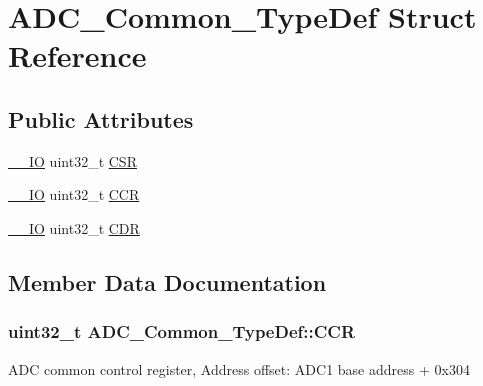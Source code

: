 \hypertarget{struct_a_d_c___common___type_def}{}\section{A\+D\+C\+\_\+\+Common\+\_\+\+Type\+Def Struct Reference}
\label{struct_a_d_c___common___type_def}
\subsection*{Public Attributes}
\begin{DoxyCompactItemize}
\item 
\hyperlink{core__cm4_8h_aec43007d9998a0a0e01faede4133d6be}{\+\_\+\+\_\+\+IO} uint32\+\_\+t \hyperlink{struct_a_d_c___common___type_def_ac38e24f600f9e134a54a0c43b976a4f4}{C\+SR}
\item 
\hyperlink{core__cm4_8h_aec43007d9998a0a0e01faede4133d6be}{\+\_\+\+\_\+\+IO} uint32\+\_\+t \hyperlink{struct_a_d_c___common___type_def_aee6d4af7571a1bad2fec9e7b53733277}{C\+CR}
\item 
\hyperlink{core__cm4_8h_aec43007d9998a0a0e01faede4133d6be}{\+\_\+\+\_\+\+IO} uint32\+\_\+t \hyperlink{struct_a_d_c___common___type_def_a6f7399bf70f677ef5de46a3038f414e1}{C\+DR}
\end{DoxyCompactItemize}


\subsection{Member Data Documentation}
\subsubsection[{\texorpdfstring{C\+CR}{CCR}}]{ uint32\+\_\+t A\+D\+C\+\_\+\+Common\+\_\+\+Type\+Def\+::\+C\+CR}\hypertarget{struct_a_d_c___common___type_def_aee6d4af7571a1bad2fec9e7b53733277}{}\label{struct_a_d_c___common___type_def_aee6d4af7571a1bad2fec9e7b53733277}
A\+DC common control register, Address offset\+: A\+D\+C1 base address + 0x304 
